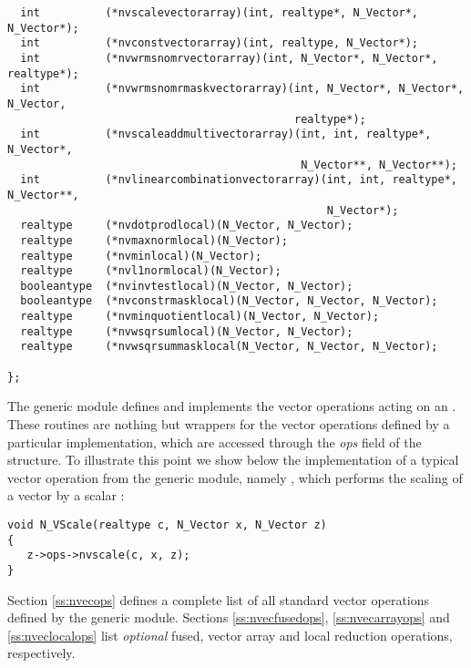 \begin{verbatim}
  int          (*nvscalevectorarray)(int, realtype*, N_Vector*, N_Vector*);
  int          (*nvconstvectorarray)(int, realtype, N_Vector*);
  int          (*nvwrmsnomrvectorarray)(int, N_Vector*, N_Vector*, realtype*);
  int          (*nvwrmsnomrmaskvectorarray)(int, N_Vector*, N_Vector*, N_Vector,
                                            realtype*);
  int          (*nvscaleaddmultivectorarray)(int, int, realtype*, N_Vector*,
                                             N_Vector**, N_Vector**);
  int          (*nvlinearcombinationvectorarray)(int, int, realtype*, N_Vector**,
                                                 N_Vector*);
  realtype     (*nvdotprodlocal)(N_Vector, N_Vector);
  realtype     (*nvmaxnormlocal)(N_Vector);
  realtype     (*nvminlocal)(N_Vector);
  realtype     (*nvl1normlocal)(N_Vector);
  booleantype  (*nvinvtestlocal)(N_Vector, N_Vector);
  booleantype  (*nvconstrmasklocal)(N_Vector, N_Vector, N_Vector);
  realtype     (*nvminquotientlocal)(N_Vector, N_Vector);
  realtype     (*nvwsqrsumlocal)(N_Vector, N_Vector);
  realtype     (*nvwsqrsummasklocal(N_Vector, N_Vector, N_Vector);

};
\end{verbatim}

The generic {\nvector} module defines and implements the vector operations
acting on an . These routines are nothing but wrappers for
the vector operations defined by a particular {\nvector} implementation,
which are accessed through the {\em ops} field of the 
structure. To illustrate this point we show below the implementation of a
typical vector operation from the generic {\nvector} module, namely ,
which performs the scaling of a vector  by a scalar :
\begin{verbatim}
void N_VScale(realtype c, N_Vector x, N_Vector z)
{
   z->ops->nvscale(c, x, z);
}
\end{verbatim}
Section \ref{ss:nvecops} defines a complete list of all standard vector operations
defined by the generic {\nvector} module. Sections \ref{ss:nvecfusedops},
\ref{ss:nvecarrayops} and \ref{ss:nveclocalops} list \textit{optional} fused,
vector array and local reduction operations, respectively.


